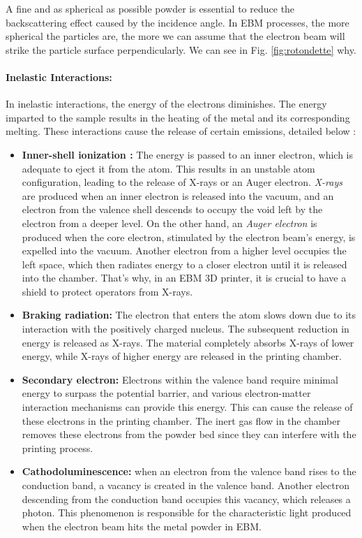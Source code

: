 A fine and as spherical as possible powder is essential to reduce the backscattering effect caused by the incidence angle. In EBM processes, the more spherical the particles are, the more we can assume that the electron beam will strike the particle surface perpendicularly. We can see in Fig. \ref{fig:rotondette} why.
\paragraph{Inelastic Interactions:} In inelastic interactions, the energy of the electrons diminishes. The energy imparted to the sample results in the heating of the metal and its corresponding melting. These interactions cause the release of certain emissions, detailed below \cite{krumeich_properties_2015, goldstein_scanning_2018}:
\begin{itemize}
    \item \textbf{Inner-shell ionization :} The energy is passed to an inner electron, which is adequate to eject it from the atom. This results in an unstable atom configuration, leading to the release of X-rays or an Auger electron. \emph{X-rays} are produced when an inner electron is released into the vacuum, and an electron from the valence shell descends to occupy the void left by the electron from a deeper level. On the other hand, an \emph{Auger electron} is produced when the core electron, stimulated by the electron beam's energy, is expelled into the vacuum. Another electron from a higher level occupies the left space, which then radiates energy to a closer electron until it is released into the chamber. That's why, in an EBM 3D printer, it is crucial to have a shield to protect operators from X-rays.
    \item \textbf{Braking radiation:} The electron that enters the atom slows down due to its interaction with the positively charged nucleus. The subsequent reduction in energy is released as X-rays. The material completely absorbs X-rays of lower energy, while X-rays of higher energy are released in the printing chamber.
    \item \textbf{Secondary electron:} Electrons within the valence band require minimal energy to surpass the potential barrier, and various electron-matter interaction mechanisms can provide this energy. This can cause the release of these electrons in the printing chamber. The inert gas flow in the chamber removes these electrons from the powder bed since they can interfere with the printing process.
    \item \textbf{Cathodoluminescence:} when an electron from the valence band rises to the conduction band, a vacancy is created in the valence band. Another electron descending from the conduction band occupies this vacancy, which releases a photon. This phenomenon is responsible for the characteristic light produced when the electron beam hits the metal powder in EBM. 

\end{itemize}
